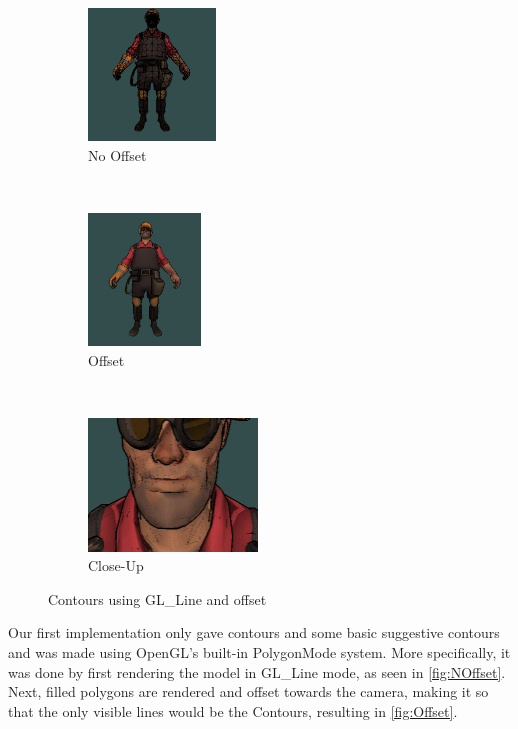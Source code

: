 \begin{figure}[h]
    \centering
        \begin{subfigure}[b]{0.3\textwidth}
        \centering
        \includegraphics[height=100pt]{img/ModelA.png}
        \caption{No Offset}
        \label{fig:NOffset}
    \end{subfigure}
    ~
        \begin{subfigure}[b]{0.3\textwidth}
        \centering
        \includegraphics[height=100pt]{img/ModelB.png}
        \caption{Offset}
        \label{fig:Offset}
    \end{subfigure}
    ~
        \begin{subfigure}[b]{0.3\textwidth}
        \centering
        \includegraphics[height=100pt]{img/ModelC.png}
        \caption{Close-Up}
        \label{fig:ZOffset}
    \end{subfigure}
    \caption{Contours using GL\_Line and offset}
    \label{fig:ZOffset}
    \end{figure}

Our first implementation only gave contours and some basic suggestive contours and was made using OpenGL's
built-in PolygonMode system. More specifically, it was done by first rendering the model in GL\_Line mode, as 
seen in \autoref{fig:NOffset}. Next, filled polygons are rendered and offset towards 
the camera, making it so that the only visible lines would be the Contours, resulting in \autoref{fig:Offset}.

